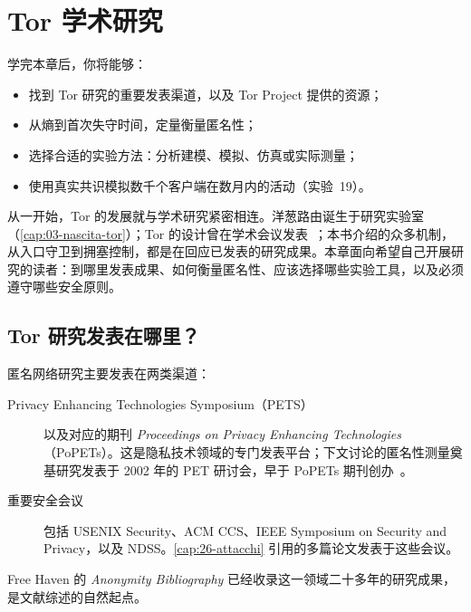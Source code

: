 \chapter{Tor 学术研究}\label{cap:29-ricerca}

\begin{obiettivi}
学完本章后，你将能够：
\begin{itemize}[nosep]
  \item 找到 Tor 研究的重要发表渠道，以及 Tor Project 提供的资源；
  \item 从熵到首次失守时间，定量衡量匿名性；
  \item 选择合适的实验方法：分析建模、模拟、仿真或实际测量；
  \item 使用真实共识模拟数千个客户端在数月内的活动（实验~19）。
\end{itemize}
\end{obiettivi}

从一开始，Tor 的发展就与学术研究紧密相连。洋葱路由诞生于研究实验室（\cref{cap:03-nascita-tor}）；Tor 的设计曾在学术会议发表~\cite{dingledine2004tor}；本书介绍的众多机制，从入口守卫到拥塞控制，都是在回应已发表的研究成果。本章面向希望自己开展研究的读者：到哪里发表成果、如何衡量匿名性、应该选择哪些实验工具，以及必须遵守哪些安全原则。

\section{Tor 研究发表在哪里？}\label{sec:ric-dove}

匿名网络研究主要发表在两类渠道：
\begin{description}
  \item[Privacy Enhancing Technologies Symposium（PETS）] 以及对应的期刊 \emph{Proceedings on Privacy Enhancing Technologies}（PoPETs）。这是隐私技术领域的专门发表平台；下文讨论的匿名性测量奠基研究发表于 2002 年的 PET 研讨会，早于 PoPETs 期刊创办~\cite{diaz2002measuring}。
  \item[重要安全会议] 包括 USENIX Security、ACM CCS、IEEE Symposium on Security and Privacy，以及 NDSS。\cref{cap:26-attacchi} 引用的多篇论文发表于这些会议。
\end{description}
Free Haven 的 \emph{Anonymity Bibliography} 已经收录这一领域二十多年的研究成果，是文献综述的自然起点。

